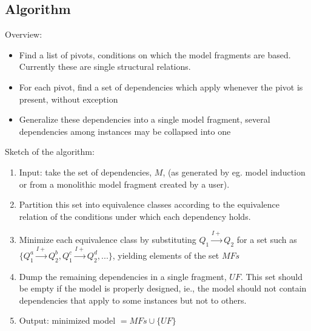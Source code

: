 \documentclass{article} %
\begin{document}
\subsection{Algorithm}

Overview:

\begin{itemize}

\item Find a list of pivots, conditions on which the model fragments are
	based. Currently these are single structural relations.

\item For each pivot, find a set of dependencies which apply whenever the
	pivot is present, without exception

\item Generalize these dependencies into a single model fragment, several
	dependencies among instances may be collapsed into one

\end{itemize}

%
%

Sketch of the algorithm:

\begin{enumerate}

\item Input: take the set of dependencies, $M$, (as generated by eg. model
	induction or from a monolithic model fragment created by a user).  

\item Partition this set into equivalence classes according to the
	equivalence relation of the conditions under which each dependency
	holds.

\item Minimize each equivalence class by substituting 
	$Q_1 \overset{I+}{\rightarrow} Q_2 $ for a set such as 
	$ \{ Q_1^a \overset{I+}{\rightarrow} Q_2^b, Q_1^c \overset{I+}{\rightarrow} Q_2^d,  . . . \} $, 
	yielding elements of the set $MFs$

\item Dump the remaining dependencies in a single fragment, $UF$. 
	This set should be empty if the model is properly designed, ie., the
	model should not contain dependencies that apply to some instances but
	not to others.

\item Output: minimized model $ = MFs \cup \{ UF \} $

\end{enumerate}
\end{document}
